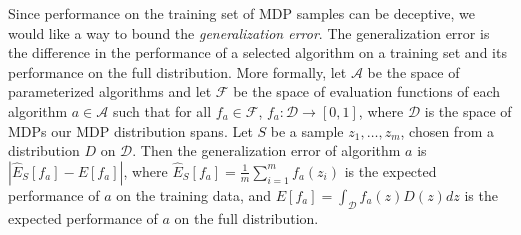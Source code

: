 Since performance on the training set of MDP samples can be deceptive, we would like a way to bound the {\em generalization error}. The generalization error is the difference in the performance of a selected algorithm on a training set and its performance on the full distribution. More formally, let $\mathcal{A}$ be the space of parameterized algorithms and let $\mathcal{F}$ be the space of evaluation functions of each algorithm $a \in \mathcal{A}$ such that for all $f_a \in \mathcal{F}$, $f_a : \mathcal{D} \rightarrow [0,1]$, where $\mathcal{D}$ is the space of MDPs our MDP distribution spans. Let $S$ be a sample $z_1,\dots, z_m$, chosen from a distribution $D$ on $\mathcal{D}$. Then the generalization error of algorithm $a$ is $| \hat{E}_S[f_a] - E[f_a] |$, where $\hat{E}_S[f_a]= \frac{1}{m}\sum_{i=1}^m f_a(z_i)$ is the expected performance of $a$ on the training data, and $E[f_a]= \int_\mathcal{D} f_a(z) D(z) dz$ is the expected performance of $a$ on the full distribution.







